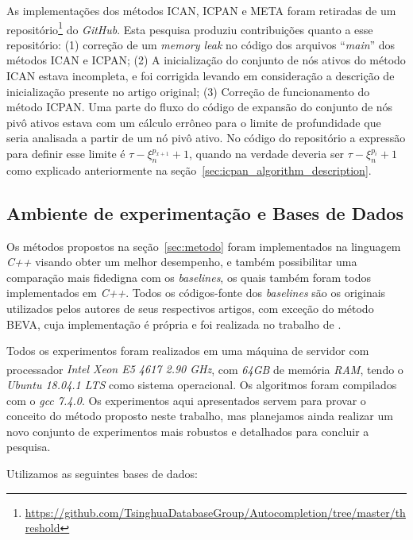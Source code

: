 As implementações dos métodos ICAN, ICPAN e META foram retiradas de um repositório\footnote{\url{https://github.com/TsinghuaDatabaseGroup/Autocompletion/tree/master/threshold}} do \textit{GitHub}. Esta pesquisa produziu contribuições quanto a esse repositório: (1) correção de um \textit{memory leak} no código dos arquivos ``\textit{main}'' dos métodos ICAN e ICPAN; (2) A inicialização do conjunto de nós ativos do método ICAN estava incompleta, e foi corrigida levando em consideração a descrição de inicialização presente no artigo original; (3) Correção de funcionamento do método ICPAN. Uma parte do fluxo do código de expansão do conjunto de nós pivô ativos estava com um cálculo errôneo para o limite de profundidade que seria analisada a partir de um nó pivô ativo. No código do repositório a expressão para definir esse limite é $\tau - \xi_{n}^{p_{x+1}} + 1$, quando na verdade deveria ser $\tau - \xi_{n}^{p_{i}} + 1$ como explicado anteriormente na seção~\ref{sec:icpan_algorithm_description}. 

\subsection{Ambiente de experimentação e Bases de Dados}

Os métodos propostos na seção~\ref{sec:metodo} foram implementados na linguagem \textit{C++} visando obter um melhor desempenho, e também possibilitar uma comparação mais fidedigna com os \textit{baselines}, os quais também foram todos implementados em \textit{C++}. Todos os códigos-fonte dos \textit{baselines} são os originais utilizados pelos autores de seus respectivos artigos, com exceção do método BEVA, cuja implementação é própria e foi realizada no trabalho de \cite{berg2020}.

Todos os experimentos foram realizados em uma máquina de servidor com processador \textit{Intel \textsuperscript{\textregistered} Xeon E5 4617 2.90 GHz}, com \textit{64GB} de memória \textit{RAM}, tendo o \textit{Ubuntu 18.04.1 LTS} como sistema operacional. Os algoritmos foram compilados com o \textit{gcc 7.4.0}. Os experimentos aqui apresentados servem para provar o conceito do método proposto neste trabalho, mas planejamos ainda realizar um novo conjunto de experimentos mais robustos e detalhados para concluir a pesquisa.

Utilizamos as seguintes bases de dados:

